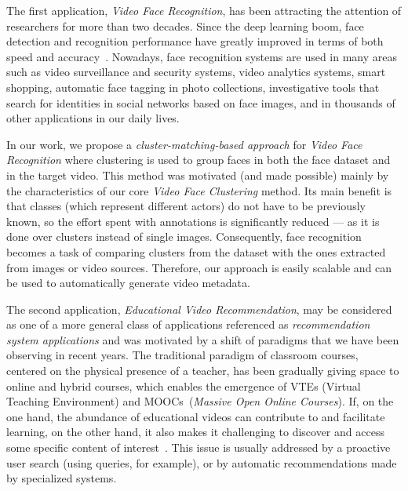 The first application, \emph{Video Face Recognition}, has been attracting the attention of researchers for more than two decades. Since the deep learning boom, face detection and recognition performance have greatly improved in terms of both speed and accuracy~\cite{masi2018deep}. Nowadays, face recognition systems are used in many areas such as video surveillance and security systems, video analytics systems, smart shopping, automatic face tagging in photo collections, investigative tools that search for identities in social networks based on face images, and in thousands of other applications in our daily lives.

In our work, we propose a \textit{cluster-matching-based approach} for \emph{Video Face Recognition} where clustering is used to group faces in both the face dataset and in the target video. This method was motivated (and made possible) mainly by the characteristics of our core \emph{Video Face Clustering} method. Its main benefit is that classes (which represent different actors) do not have to be previously known, so the effort spent with annotations is significantly reduced --- as it is done over clusters instead of single images. Consequently, face recognition becomes a task of comparing clusters from the dataset with the ones extracted from images or video sources. Therefore, our approach is easily scalable and can be used to automatically generate video metadata.

The second application, \emph{Educational Video Recommendation}, may be considered as one of a more general class of applications referenced as \textit{recommendation system applications} and was motivated by a shift of paradigms that we have been observing in recent years. The traditional paradigm of classroom courses, centered on the physical presence of a teacher, has been gradually giving space to online and hybrid courses, which enables the emergence of VTEs (Virtual Teaching Environment) and MOOCs~(\textit{Massive Open Online Courses}).
If, on the one hand, the abundance of educational videos can contribute to and facilitate learning, on the other hand, it also makes it challenging to discover and access some specific content of interest~\cite{dias2017approach}.
This issue is usually addressed by a proactive user search (using queries, for example), or by automatic recommendations made by specialized systems.


